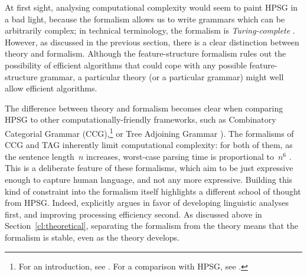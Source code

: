 \documentclass[output=paper,nonflat]{langsci/langscibook}
\begin{document}
At first sight, analysing computational complexity
would seem to paint HPSG in a bad light,
because the formalism allows us to write grammars
which can be arbitrarily complex;
in technical terminology, the formalism is \textit{Turing-complete}
\citep[Section~3.4]{Johnson88}.
However, as discussed in the previous section,
there is a clear distinction between theory and formalism.
Although the feature-structure formalism rules out the possibility of efficient algorithms
that could cope with any possible feature-structure grammar,
a particular theory (or a particular grammar) might well allow efficient algorithms.

The difference between theory and formalism
becomes clear when comparing HPSG to other computationally-friendly frameworks,
such as Combinatory Categorial Grammar (CCG),\footnote{%
	For an introduction, see \citet{steedman2011ccg}.
	For a comparison with HPSG, see .
}
or Tree Adjoining Grammar \citep[TAG;][]{Joshi87a-u,SAJ88a-u}).
The formalisms of CCG and TAG inherently limit computational complexity:
for both of them, as the sentence length~$n$ increases,
worst-case parsing time is proportional to~$n^6$ \citep{Kasamietal1989}.
This is a deliberate feature of these formalisms,
which aim to be just expressive enough to capture human language,
and not any more expressive.
Building this kind of constraint into the formalism itself
highlights a different school of thought from HPSG.
Indeed, \citet{MuellerCoreGram} explicitly argues
in favor of developing linguistic analyses first,
and improving processing efficiency second.
As discussed above in Section~\ref{cl:theoretical},
separating the formalism from the theory
means that the formalism is stable, even as the theory develops.

\end{document}
